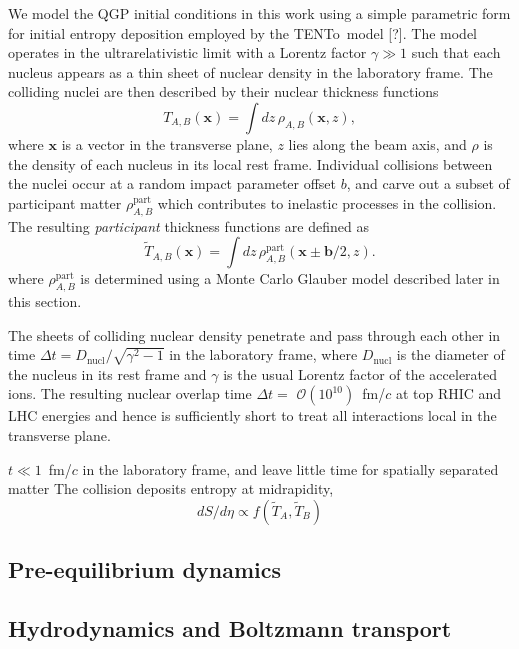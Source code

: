 \documentclass[aps,prc,reprint,amsmath,nofootinbib]{revtex4-1}
\newcommand{\trento}{T\raisebox{-0.5ex}{R}ENTo}
\newcommand{\T}{\tilde{T}}
\newcommand{\order}[1]{$\mathcal O(10^{#1})$}
\newcommand{\note}{\textcolor{theblue}{[?]}}
\begin{document}
  We model the QGP initial conditions in this work using a simple parametric form for initial entropy deposition employed by the \trento\ model \note.
The model operates in the ultrarelativistic limit with a Lorentz factor $\gamma \gg 1$ such that each nucleus appears as a thin sheet of nuclear density in the laboratory frame.
The colliding nuclei are then described by their nuclear thickness functions
\begin{equation}
  T_{A,B}(\mathbf{x}) = \int dz\, \rho_{A,B}(\mathbf{x}, z),
\end{equation}
where $\mathbf{x}$ is a vector in the transverse plane, $z$ lies along the beam axis, and $\rho$ is the density of each nucleus in its local rest frame.
Individual collisions between the nuclei occur at a random impact parameter offset $b$, and carve out a subset of participant matter $\rho_{A,B}^\text{part}$ which contributes to inelastic processes in the collision.
The resulting \emph{participant} thickness functions are defined as
\begin{equation}
  \T_{A,B}(\mathbf{x}) = \int dz\, \rho^\text{part}_{A,B}(\mathbf{x} \pm \mathbf{b}/2, z).
\end{equation}
where $\rho^\text{part}_{A,B}$ is determined using a Monte Carlo Glauber model described later in this section.

The sheets of colliding nuclear density penetrate and pass through each other in time $\Delta t = D_\text{nucl} / \sqrt{\gamma^2 - 1}$ in the laboratory frame, where $D_\text{nucl}$ is the diameter of the nucleus in its rest frame and $\gamma$ is the usual Lorentz factor of the accelerated ions.
The resulting nuclear overlap time $\Delta t =$ \order{10}~fm/$c$ at top RHIC and LHC energies and hence is sufficiently short to treat all interactions local in the transverse plane.


$t\ll 1$~fm/$c$ in the laboratory frame, and leave little time for spatially separated matter
The collision deposits entropy at midrapidity, 
\begin{equation}
  dS/d\eta \propto f(\T_A, \T_B)
\end{equation}

\subsection{Pre-equilibrium dynamics}


\subsection{Hydrodynamics and Boltzmann transport}
\end{document}
